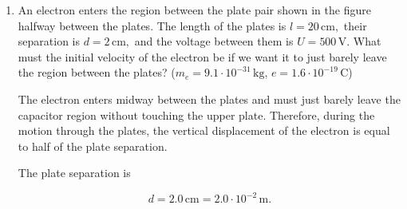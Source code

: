 \documentclass[letterpaper,12pt]{letter}
\begin{document}
\begin{enumerate}[label=\Roman*.]
\begin{enumerate}[label=\arabic*.]
\pagebreak
\item An electron enters the region between the plate pair shown in the figure halfway between the plates. The length of the plates is $ l = 20\,\mathrm{cm}, $ their separation is $ d = 2\,\mathrm{cm}, $ and the voltage between them is $ U = 500\,\mathrm{V}. $ What must the initial velocity of the electron be if we want it to just barely leave the region between the plates? ($m_{e}=9.1\cdot 10^{-31}\,\mathrm{kg}$, $e=1.6\cdot 10^{-19}\,\mathrm{C}$)

\begin{center}
\end{center}

\bigskip

The electron enters midway between the plates and must just barely leave the capacitor region without touching the upper plate. Therefore, during the motion through the plates, the vertical displacement of the electron is equal to half of the plate separation.

The plate separation is

$$d=2.0\,\mathrm{cm}=2.0\cdot10^{-2}\,\mathrm{m}.$$


\end{enumerate}
\end{enumerate}
\end{document}
